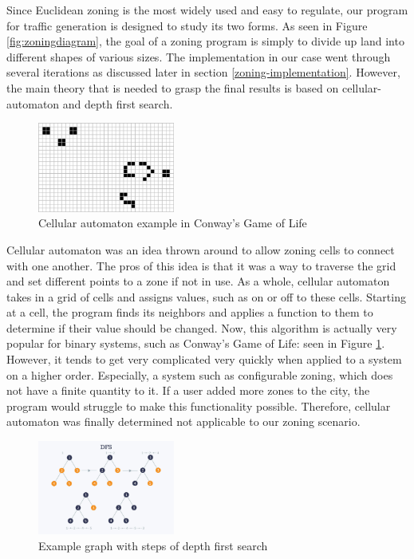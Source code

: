 \documentclass[11pt]{article}
\begin{document}
\begin{multicols}{2}
    \quad Since Euclidean zoning is the most widely used and easy to regulate, our program for traffic generation is designed to study its two forms. As seen in Figure \ref{fig:zoningdiagram}, the goal of a zoning program is simply to divide up land into different shapes of various sizes. The implementation in our case went through several iterations as discussed later in section \ref{zoning-implementation}. However, the main theory that is needed to grasp the final results is based on cellular-automaton and depth first search. 

    \begin{figure}[H]
        \centering
        \includegraphics[width=0.4\textwidth]{images/cellularautomaton.png}
        \caption{Cellular automaton example in Conway's Game of Life \cite{cellularautomaton}}
        \label{fig:cellular-automaton}
    \end{figure}

    \quad Cellular automaton was an idea thrown around to allow zoning cells to connect with one another. The pros of this idea is that it was a way to traverse the grid and set different points to a zone if not in use. As a whole, cellular automaton takes in a grid of cells and assigns values, such as on or off to these cells. Starting at a cell, the program finds its neighbors and applies a function to them to determine if their value should be changed. Now, this algorithm is actually very popular for binary systems, such as Conway's Game of Life: seen in Figure \ref{fig:cellular-automaton}. However, it tends to get very complicated very quickly when applied to a system on a higher order. Especially, a system such as configurable zoning, which does not have a finite quantity to it. If a user added more zones to the city, the program would struggle to make this functionality possible. Therefore, cellular automaton was finally determined not applicable to our zoning scenario.\\

    \begin{figure}[H]
        \centering
        \includegraphics[width=0.4\textwidth]{images/depthfirstsearch.jpg}
        \caption{Example graph with steps of depth first search \cite{depthfirstsearch}}
        \label{fig:depth-first-search}
    \end{figure}


\end{multicols}
\end{document}

